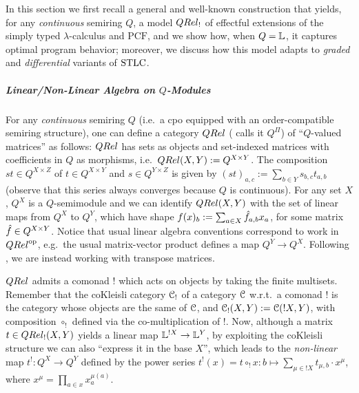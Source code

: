In this section we first recall a general and well-known construction that yields, for any \emph{continuous} semiring $Q$, a model $\QREL_{!}$ of effectful extensions of the simply typed $\lambda$-calculus and $\mathrm{PCF}$, and we show how, when $Q=\mathbb{L}$, it captures optimal program behavior; moreover, we discuss how this model adapts to \emph{graded} and \emph{differential} variants of $\mathrm{STLC}$. 

\subparagraph*{Linear/Non-Linear Algebra on $Q$-Modules}
For any \emph{continuous} semiring $Q$ (i.e.~a cpo equipped with an order-compatible semiring structure), one can define a category $\QREL$  (\cite{Manzo2013} calls it $Q^\Pi$) of ``$Q$-valued matrices'' as follows: $\QREL$ has sets as objects and set-indexed matrices with coefficients in $Q$ as morphisms, i.e.~$\QREL(X,Y):=Q^{X\times Y}$.
The composition $st\in Q^{X\times Z}$ of $t\in Q^{X\times Y}$ and $s\in Q^{Y\times Z}$ is given by $(st)_{a,c}:=\sum_{b\in Y} s_{b,c}t_{a,b}$ (observe that this series always converges because $Q$ is continuous).
For any set $X$, $Q^X$ is a $Q$-semimodule and we can identify $\HOM{\QREL}{X}{Y}$ with the set of linear maps from $Q^X$ to $Q^Y$, which have shape $f(x)_b:=\sum_{a\in X} \hat{f}_{a,b}x_a$, for some matrix $\hat{f}\in Q^{X\times Y}$.
% 
Notice that usual linear algebra conventions correspond to work in $\QREL^{\op}$, %
e.g.\ the usual matrix-vector product defines a map $Q^Y\to Q^X$.
Following \cite{Manzo2013, Hofmann2014, Ehrhard2005}, we are instead working with transpose matrices.

$\QREL$ admits a comonad $!$ which acts on objects by taking the finite multisets.
Remember that the coKleisli category $\mathcal{C}_!$ of a category $\mathcal{C}$ w.r.t.\ a comonad $!$ is the category whose objects are the same of $\mathcal{C}$, and ${\mathcal{C}_!}(X,Y):={\mathcal{C}}(!X,Y)$, with composition $\circ_!$ defined via the co-multiplication of $!$.
Now, although a matrix $t\in\HOM{\QREL_!}{X}{Y}$ yields a linear map $\mathbb{L}^{!X}\to\mathbb{L}^Y$, by exploiting the coKleisli structure we can also ``express it in the base $X$'', which leads to the \emph{non-linear} map $t^{!}:Q^{X}\to Q^{Y}$ defined by the power series
$
t^{!}(x)=t\circ_{!}x : b \mapsto \sum_{\mu\in !X}t_{\mu,b}\cdot x^{\mu}
$, 
where $x^{\mu}= \prod_{a\in x}x_{a}^{\mu(a)}$. 


